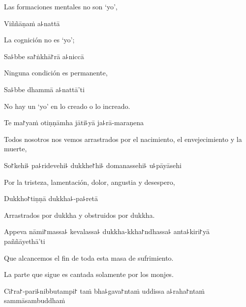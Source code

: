 \begin{english}
  Las formaciones mentales no son `yo',
\end{english}

Viññāṇaṁ a꜕nattā

\begin{english}
  La cognición no es `yo';
\end{english}

Sa꜕bbe sa꜓ṅkhā꜓rā a꜕niccā

\begin{english}
  Ninguna condición es permanente,
\end{english}

Sa꜕bbe dhammā a꜕nattā'ti

\begin{english}
  No hay un `yo' en lo creado o lo increado.
\end{english}

\clearpage

Te ma꜓yaṁ otiṇṇāmha jāti꜕yā ja꜕rā-maraṇena

\begin{english}
  Todos nosotros nos vemos arrastrados por el nacimiento, el envejecimiento y la muerte,
\end{english}

So꜓kehi꜕ pa꜕ridevehi꜕ dukkhe꜓hi꜕ domanassehi꜕ u꜕pāyāsehi

\begin{english}
  Por la tristeza, lamentación, dolor, angustia y desespero,
\end{english}

Dukkho꜓tiṇṇā dukkha꜕-pa꜕retā

\begin{english}
  Arrastrados por dukkha y obstruidos por dukkha.
\end{english}

Appeva nāmi꜓massa꜕ kevalassa꜕ dukkha-kkha꜓ndhassa꜕ anta꜕kiri꜓yā \\paññāyethā'ti

\begin{english}
  Que alcancemos el fin de toda esta masa de sufrimiento.
\end{english}

\begin{instruction}
  La parte que sigue es cantada solamente por los monjes.
\end{instruction}

Ci꜓ra꜓-pari꜕nibbutampi꜓ taṁ bha꜕gava꜓ntaṁ uddissa a꜕raha꜓ntaṁ sammāsambuddhaṁ

